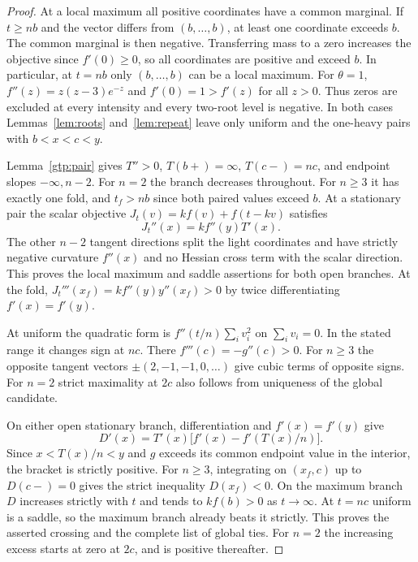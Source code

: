 \begin{proof}
At a local maximum all positive coordinates have a common marginal.
If $t\ge nb$ and the vector differs from $(b,\ldots,b)$, at least
one coordinate exceeds $b$. The common marginal is then negative.
Transferring mass to a zero increases the objective since $f'(0)\ge0$,
so all coordinates are positive and exceed $b$. In particular, at $t=nb$
only $(b,\ldots,b)$ can be a local maximum. For $\theta=1$,
$f''(z)=z(z-3)e^{-z}$ and $f'(0)=1>f'(z)$ for all $z>0$. Thus zeros
are excluded at every intensity and every two-root level is negative.
In both cases Lemmas~\ref{lem:roots} and~\ref{lem:repeat} leave only
uniform and the one-heavy pairs with $b<x<c<y$.

Lemma~\ref{gtp:pair} gives $T''>0$, $T(b+)=\infty$, $T(c-)=nc$, and
endpoint slopes $-\infty,n-2$. For $n=2$ the branch decreases throughout.
For $n\ge3$ it has exactly one fold, and $t_f>nb$ since both paired values
exceed $b$. At a stationary pair the scalar objective
$J_t(v)=kf(v)+f(t-kv)$ satisfies
\[
 J_t''(x)=k f''(y)T'(x).
\]
The other $n-2$ tangent directions split the light coordinates and have
strictly negative curvature $f''(x)$ and no Hessian cross term with the
scalar direction. This proves the local maximum and saddle assertions for both open branches. At the fold,
$J_t'''(x_f)=k f''(y)y''(x_f)>0$ by twice differentiating $f'(x)=f'(y)$.

At uniform the quadratic form is $f''(t/n)\sum_i v_i^2$ on $\sum_i v_i=0$.
In the stated range it changes sign at $nc$. There $f'''(c)=-g''(c)>0$.
For $n\ge3$ the opposite tangent vectors $\pm(2,-1,-1,0,\ldots)$
give cubic terms of opposite signs. For $n=2$ strict maximality at $2c$
also follows from uniqueness of the global candidate.

On either open stationary branch, differentiation and $f'(x)=f'(y)$ give
\begin{equation}\label{gtp:excess}
 D'(x)=T'(x)\bigl[f'(x)-f'(T(x)/n)\bigr].
\end{equation}
Since $x<T(x)/n<y$ and $g$ exceeds its common endpoint value in the
interior, the bracket is strictly positive. For $n\ge3$, integrating
on $(x_f,c)$ up to $D(c-)=0$ gives the strict inequality $D(x_f)<0$.
On the maximum branch $D$ increases strictly with $t$ and tends to
$k f(b)>0$ as $t\to\infty$. At $t=nc$ uniform is a saddle, so the
maximum branch already beats it strictly. This proves the asserted
crossing and the complete list of global ties. For $n=2$ the increasing
excess starts at zero at $2c$, and is positive thereafter.
\end{proof}

